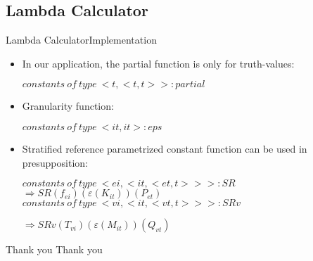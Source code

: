 \documentclass{beamer}
\begin{document}
\subsection{Lambda Calculator}

\begin{frame}{Lambda Calculator}{Implementation}

\begin{itemize}
    \item{In our application, the partial function is only for truth-values:
    
    $constants\ of\ type\ <t,<t,t>> : partial$
    }
    \item{Granularity function:
    
    $constants\ of\ type\ <it,it> : eps$
    }
    \item{Stratified reference parametrized constant function can be used in presupposition:

    $constants\ of\ type\ <ei,<it,<et,t>>> : SR$ \\
    
    $\Rightarrow SR(f_{ei})(\varepsilon(K_{it}))(P_{et})$ \\
    
    $constants\ of\ type\ <vi,<it,<vt,t>>> : SRv$

    $\Rightarrow SRv(T_{vi})(\varepsilon(M_{it}))(Q_{vt})$ \\
    
    }
\end{itemize}
\end{frame}

\begin{frame}{Thank you}
    Thank you
\end{frame}
\end{document}
